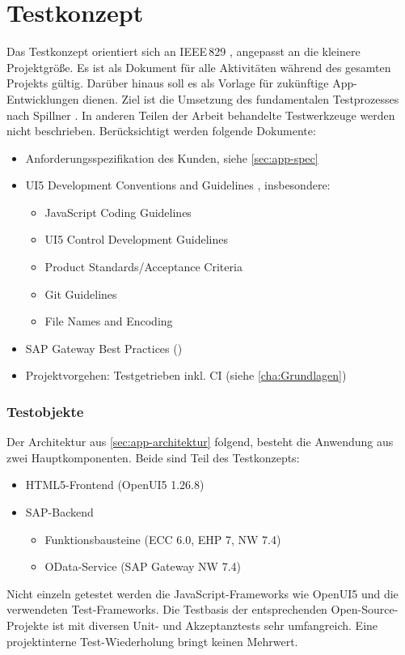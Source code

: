 \section{Testkonzept}
Das Testkonzept orientiert sich an IEEE\,829 \cite{IEEE829}, angepasst an die kleinere Projektgröße. Es ist als Dokument für alle Aktivitäten während des gesamten Projekts gültig. Darüber hinaus soll es als Vorlage für zukünftige App-Entwicklungen dienen. Ziel ist die Umsetzung des fundamentalen Testprozesses nach Spillner \cite{SpillnerRossnerWinterLinz2014}. In anderen Teilen der Arbeit behandelte Testwerkzeuge werden nicht beschrieben. Berücksichtigt werden folgende Dokumente:
\begin{itemize}
	\item Anforderungsspezifikation des Kunden, siehe \autoref{sec:app-spec}
	\item UI5 Development Conventions and Guidelines \cite{SAP2014_1}, insbesondere:
	\begin{itemize}
		\item JavaScript Coding Guidelines
		\item UI5 Control Development Guidelines
		\item Product Standards/Acceptance Criteria
		\item Git Guidelines
		\item File Names and Encoding	
	\end{itemize}
	\item SAP Gateway Best Practices (\cite[S.\ 561-563]{BoennenDreesFischerHeinzStrothmann2014})
	\item Projektvorgehen: Testgetrieben inkl. \ac{CI} (siehe \autoref{cha:Grundlagen})
\end{itemize}


\subsubsection{Testobjekte}
Der Architektur aus \autoref{sec:app-architektur} folgend, besteht die Anwendung aus zwei Hauptkomponenten. Beide sind Teil des Testkonzepts:
\begin{itemize}
	\item HTML5-Frontend (OpenUI5 1.26.8)
	\item SAP-Backend
	\begin{itemize}
		\item Funktionsbausteine (ECC 6.0, EHP 7, NW 7.4)
		\item OData-Service (SAP Gateway NW 7.4)
	\end{itemize}
\end{itemize}
Nicht einzeln getestet werden die JavaScript-Frameworks wie OpenUI5 und die verwendeten Test-Frameworks. Die Testbasis der entsprechenden Open-Source-Projekte ist mit diversen Unit- und Akzeptanztests sehr umfangreich. Eine projektinterne Test-Wiederholung bringt keinen Mehrwert.



